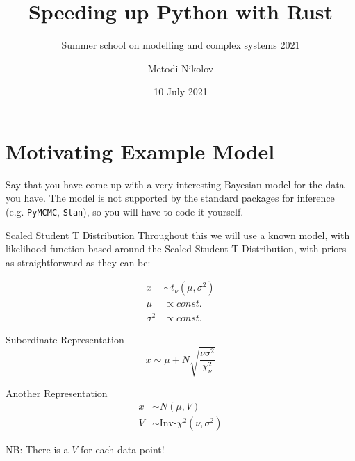 \documentclass[8pt]{beamer}
\title{Speeding up Python with Rust}
\subtitle{Summer school on modelling and complex systems 2021}
\author{Metodi Nikolov}
\date{10 July 2021}
\begin{document}
\maketitle

\begin{frame}
\tableofcontents
\end{frame}

%


\section{Motivating Example Model}
\begin{frame}
Say that you have come up with a very interesting Bayesian model for the data you have. The model is not supported by the standard packages for inference (e.g. \texttt{PyMCMC}, \texttt{Stan}), so you will have to code it yourself.
\end{frame}

\begin{frame}{Scaled Student T Distribution}
Throughout this we will use a known model, with likelihood function based around the Scaled Student T Distribution, with priors as straightforward as they can be:

\begin{align*}
x &\sim t_\nu(\mu, \sigma^2) \\
\mu &\propto const. \\
\sigma^2 &\propto const. 
\end{align*}

\pause
\begin{block}{Subordinate Representation}
	\[x \sim \mu + N\sqrt{\frac{\nu \sigma^2} {\chi^2_\nu}}\]
\end{block}
\pause
\begin{block}{Another Representation}
	\begin{align*}
	x &\sim N(\mu, V) \\
	V &\sim \text{Inv-}\chi^2(\nu, \sigma^2)
	\end{align*}
\end{block}
\pause
NB: There is a $V$ for each data point!

\end{frame}
\end{document}
